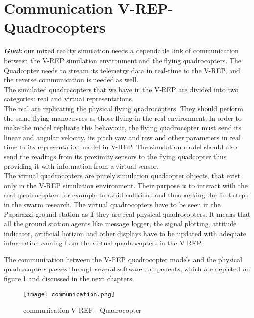     \section{Communication V-REP-Quadrocopters}
    \label{sec:comm}
    \textbf{\textit{Goal}:} our mixed reality simulation needs a dependable link of communication between the V-REP simulation environment and the flying quadrocopters. 
    The Quadcopter needs to stream its telemetry data in real-time to the V-REP, and the reverse communication is needed as well.\\
    The simulated quadrocopters that we have in the V-REP are divided into two categories: real and virtual representations.\\ 
    The real are replicating the physical flying quadrocopters. They should perform the same flying manoeuvres as those flying in the real environment. 
    In order to make the model replicate this behaviour, the flying quadrocopter must send its linear and angular velocity, its pitch yaw and row and other parameters in real time to its representation model in V-REP. 
    The simulation model should also send the readings from its proximity sensors to the flying quadcopter thus providing it with information from a virtual sensor. \\
    The virtual quadrocopters are purely simulation quadcopter objects, that exist only in the V-REP simulation environment. Their purpose is to interact with the real quadrocopters for example to avoid collisions and thus making the first steps in the swarm research. The virtual quadrocopters have to be seen in the Paparazzi ground station as if they are real physical quadrocopters. It means that all the ground station agents like message logger, the signal plotting, attitude indicator, artificial horizon and other displays have to be updated with adequate information coming from the virtual quadrocopters in the V-REP.
    
    The communication between the V-REP quadrocopter models and the physical quadrocopters passes through several software components, which are depicted on figure \ref{fig:communication} and discussed in the next chapters.
    
    \begin{figure}[h!]
     \begin{center}
      \texttt{[image: communication.png]}
     \end{center}
      \caption{communication V-REP - Quadrocopter\label{fig:communication}}
    \end{figure}
    
